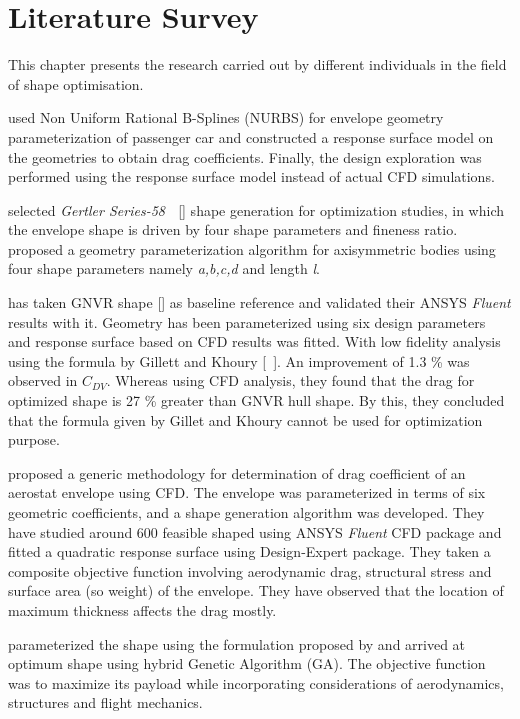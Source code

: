 
\chapter{Literature Survey}
\label{literature}
This chapter presents the research carried out by different individuals in the field of shape optimisation.

\cite{OsamaAbdulGhani2013} used Non Uniform Rational B-Splines (NURBS) for envelope geometry parameterization of passenger car and constructed a response surface model on the geometries to obtain drag coefficients. Finally, the design exploration was performed using the response surface model instead of actual CFD simulations.

\cite{alam2016mdo} selected \textit{Gertler Series-58} $ \; $ [] shape generation for optimization studies, in which the envelope shape is driven by four shape parameters and fineness ratio. \cite{Wang2010} proposed a geometry parameterization algorithm for axisymmetric bodies using four shape parameters namely \textit{a,b,c,d} and length \textit{l}.

\cite{kanikdale2004multi} has taken GNVR shape []  as baseline reference and validated their ANSYS\textsuperscript{\textregistered} \textit{Fluent} results with it. Geometry has been parameterized using six design parameters and response surface based on CFD results was fitted. With low fidelity analysis using the formula by Gillett and Khoury [~]. An improvement of 1.3 \% was observed in $ C_{DV} $. Whereas using CFD analysis, they found that the drag for optimized shape is 27 \% greater than GNVR hull shape. By this, they concluded that the formula given by Gillet and Khoury cannot be used for optimization purpose.

\cite{Kale2005a} proposed a generic methodology for determination of drag coefficient of an aerostat envelope using CFD. The envelope was parameterized in terms of six geometric coefficients, and a shape generation algorithm was developed. They have studied around 600 feasible shaped using ANSYS\textsuperscript{\textregistered} \textit{Fluent} CFD package and fitted a quadratic response surface using Design-Expert package. They taken a composite objective function involving aerodynamic drag, structural stress and surface area (so weight) of the envelope. They have observed that the location of maximum thickness affects the drag mostly. 

\cite{Ram2010} parameterized the shape using the formulation proposed by \cite{kanikdale2004multi} and arrived at optimum shape using hybrid Genetic Algorithm (GA). The objective function was to maximize its payload while incorporating considerations of aerodynamics, structures and flight mechanics.

